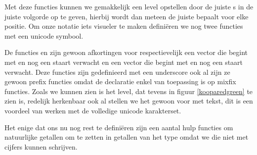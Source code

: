 Met deze functies kunnen we gemakkelijk een level opstellen door de juiste
s in de juiste volgorde op te geven, hierbij wordt dan meteen
de juiste  bepaalt voor elke positie. Om onze notatie iets
visueler te maken definiëren we nog twee functies met een unicode symbool.


De functies  en  zijn gewoon afkortingen voor
respectievelijk een vector die begint met  en nog een staart
verwacht en een vector die begint met  en nog een staart verwacht.
Deze functies zijn gedefinieerd met een underscore ook al zijn ze gewoon prefix
functies omdat de  declaratie enkel van toepassing is op mixfix
functies. Zoals we kunnen zien is het level, dat tevens in figuur
\ref{kooparedgreen} te zien is, redelijk herkenbaar ook al stellen we het
gewoon voor met tekst, dit is een voordeel van werken met de volledige unicode
karakterset.

Het enige dat ons nu nog rest te definiëren zijn een aantal hulp functies om
natuurlijke getallen om te zetten in getallen van het type  omdat
we die niet met cijfers kunnen schrijven.


